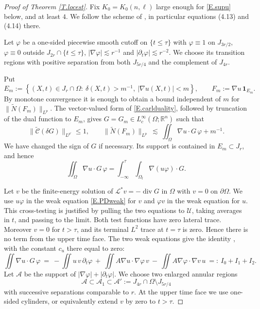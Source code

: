 \documentclass[12pt,leqno]{amsart}
\numberwithin{equation}{section}
\DeclareMathOperator{\divg}{div}
\newcommand{\R}{\mathbb R}
\newcommand{\wt}{\widetilde}
\newcommand{\abs}[1]{\left\vert#1\right\vert}
\newcommand{\set}[1]{\left\{#1\right\}}
\newcommand{\om}{\Omega}
\newcommand{\pom}{\partial\Omega}
\newcommand{\pd}{\partial}
\newcommand{\LL}{\mathcal L}
\newcommand{\Uc}{\mathcal U}
\newcommand{\Nt}{\widetilde N}
\theoremstyle{plain}
\theoremstyle{remark}
\begin{document}
\begin{proof}[Proof of Theorem \ref{T.locest}]
Fix $K_0=K_0(n,\ell)$ large enough for \eqref{E.supu} below, and at least
$4$. We follow the scheme of \cite[Lemma 4.12]{DLP2}, in particular equations
(4.13) and (4.14) there.\medskip

Let $\varphi$ be a one-sided piecewise smooth cutoff on $\{t\le\tau\}$ with
$\varphi\equiv1$ on $J_{3r/2}$, $\varphi\equiv0$ outside
$J_{2r}\cap\{t\le\tau\}$, $\abs{\nabla\varphi}\lesssim r^{-1}$ and
$\abs{\pd_t\varphi}\lesssim r^{-2}$. We choose its transition regions with
positive separation from both $J_{5r/4}$ and the complement of $J_{4r}$.

Put
$$E_m:=\set{(X,t)\in J_r\cap\om:\ \delta(X,t)>m^{-1},\
 |\nabla u(X,t)|<m},\qquad
 F_m:=\nabla u\,\mathbf1_{E_m}.$$
By monotone convergence it is enough to obtain a bound independent of $m$ for
$\|\Nt(F_m)\|_{L^p}$. The vector-valued form of
\eqref{E.carlduality}, followed by truncation of the dual function to $E_m$,
gives $G=G_m\in L^\infty_c(\om;\R^n)$ such that
$$\|\wt{\mathcal C}(\delta G)\|_{L^{p'}}\le1,
  \qquad
  \|\Nt(F_m)\|_{L^p}
  \ \lesssim\ \iint_\om\nabla u\cdot G\,\varphi+m^{-1}.$$
We have changed the sign of $G$ if necessary. Its support is contained in
$E_m\subset J_r$, and hence
$$\iint_\om\nabla u\cdot G\,\varphi
  =\int_{-\infty}^\tau\!\!\int_{\om_t}\nabla(u\varphi)\cdot G .$$

Let $v$ be the finite-energy solution of $\LL^*v=-\divg G$ in $\om$ with
$v=0$ on $\pom$. We use $u\varphi$ in the weak equation \eqref{E.PDweak} for
$v$ and
$\varphi v$ in the weak equation for $u$. This cross-testing is justified by
pulling the two equations to $\Uc$, taking  averages in $t$, and passing
to the limit. Both test functions have zero lateral trace. Moreover $v=0$ for
$t>\tau$, and its terminal $L^2$ trace at $t=\tau$ is zero. Hence there is no
term from the upper time face. The two weak equations give the identity
\cite[(4.16)]{DLP2}, with the constant $c_u$ there equal to zero:
$$\iint\nabla u\cdot G\,\varphi
  \ =\ -\iint u\,v\,\pd_t\varphi
  \ +\ \iint A\nabla u\cdot\nabla\varphi\,v
  \ -\ \iint A\nabla\varphi\cdot\nabla v\,u
  \ =:\ I_0+I_1+I_2 .$$
Let $\mathcal A$ be the support of
$|\nabla\varphi|+|\pd_t\varphi|$. We choose two enlarged annular regions
$$\mathcal A\subset\mathcal A_1\subset\mathcal A'
 :=J_{4r}\cap\om\setminus J_{5r/4}$$
with successive separations comparable to $r$. At the upper time face we use
one-sided cylinders, or equivalently extend $v$ by zero to $t>\tau$.


\end{proof}
\end{document}
